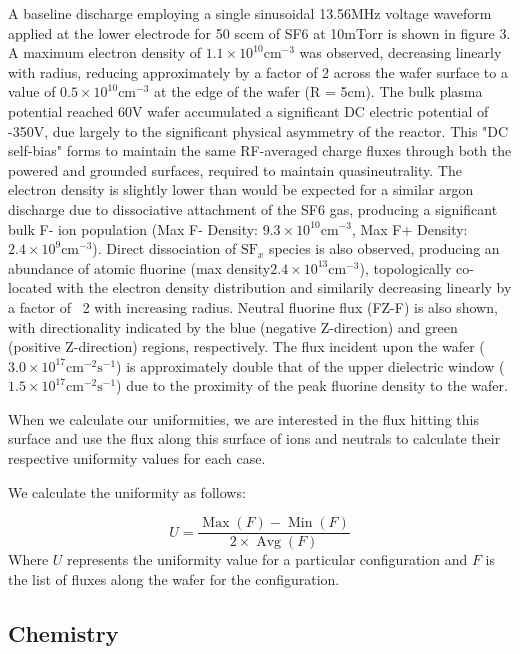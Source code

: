 \documentclass[12pt]{article}
\begin{document}
A baseline discharge employing a single sinusoidal 13.56MHz voltage waveform applied at the lower electrode for 50 sccm of SF6 at 10mTorr is shown in figure 3. A maximum electron density of $1.1\times10^{10} \text{cm}^{-3}$  was observed, decreasing linearly with radius, reducing approximately by a factor of 2 across the wafer surface to a value of $0.5\times10^{10} \text{cm}^{-3}$ at the edge of the wafer (R = 5cm). The bulk plasma potential reached 60V wafer accumulated a significant DC electric potential of -350V, due largely to the significant physical asymmetry of the reactor. This "DC self-bias" forms to maintain the same RF-averaged charge fluxes through both the powered and grounded surfaces, required to maintain quasineutrality. The electron density is slightly lower than would be expected for a similar argon discharge due to dissociative attachment of the SF6 gas, producing a significant bulk F- ion population (Max F- Density: $9.3\times10^{10} \text{cm}^{-3}$, Max F+ Density: $2.4\times10^{9} \text{cm}^{-3}$). Direct dissociation of $\text{SF}_x$ species is also observed, producing an abundance of atomic fluorine (max density$2.4\times10^{13} \text{cm}^{-3}$), topologically co-located with the electron density distribution and similarily decreasing linearly by a factor of ~2 with increasing radius. Neutral fluorine flux (FZ-F) is also shown, with directionality indicated by the blue (negative Z-direction) and green (positive Z-direction) regions, respectively. The flux incident upon the wafer ($3.0\times10^{17} \text{cm}^{-2}\text{s}^{-1}$) is approximately double that of the upper dielectric window ($1.5\times10^{17} \text{cm}^{-2}\text{s}^{-1}$) due to the proximity of the peak fluorine density to the wafer.

When we calculate our uniformities, we are interested in the flux hitting this surface and use the flux along this surface of ions and neutrals to calculate their respective uniformity values for each case.

We calculate the uniformity as follows: 

\begin{equation}
U = \frac{\operatorname{Max}(F) - \operatorname{Min}(F)}{2 \times \operatorname{Avg}(F)}
\label{eq:uniformity}
\end{equation}
Where $U$ represents the uniformity value for a particular configuration and $F$ is the list of fluxes along the wafer for the configuration.



\subsection{Chemistry}
\end{document}
